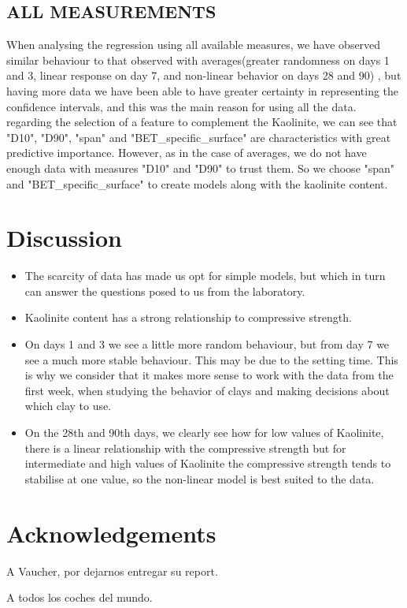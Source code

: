 \documentclass[10pt,conference,compsocconf]{IEEEtran}
\begin{document}
\subsection{ALL MEASUREMENTS}
When analysing the regression using all available measures, we have observed similar behaviour to that observed with averages(greater randomness on days 1 and 3, linear response on day 7, and non-linear behavior on days 28 and 90) , but having more data we have been able to have greater certainty in representing the confidence intervals, and this was the main reason for using all the data.
regarding the selection of a feature to complement the Kaolinite, we can see that "D10", "D90", "span" and "BET\_specific\_surface" are characteristics with great predictive importance. However, as in the case of averages, we do not have enough data with measures "D10" and "D90" to trust them. So we choose "span" and "BET\_specific\_surface" to create models along with the kaolinite content.
\section{Discussion}
\begin{itemize}
\item The scarcity of data has made us opt for simple models, but which in turn can answer the questions posed to us from the laboratory.

\item Kaolinite content has a strong relationship to compressive strength.
\item On days 1 and 3 we see a little more random behaviour, but from day 7 we see a much more stable behaviour. This may be due to the setting time. This is why we consider that it makes more sense to work with the data from the first week, when studying the behavior of clays and making decisions about which clay to use.
\item On the 28th and 90th days, we clearly see how for low values of Kaolinite, there is a linear relationship with the compressive strength but for intermediate and high values of Kaolinite the compressive strength tends to stabilise at one value, so the non-linear model is best suited to the data.
\end{itemize}

\section*{Acknowledgements}

A Vaucher, por dejarnos entregar su report.

A todos los coches del mundo.

\nocite{*}


\end{document}
